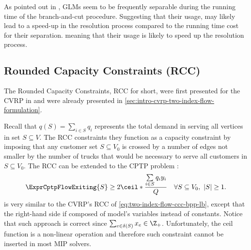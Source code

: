 As pointed out in \textcite{jepsen2014},
GLMs seem to be frequently separable during the running time of the branch-and-cut procedure.
Suggesting that their usage, may likely lead to a speed-up in the resolution process
compared to the running time cost for their separation.
meaning that their usage is likely to speed up the resolution process.

\subsection{Rounded Capacity Constraints (RCC)}
\label{sec:cptp-rcc}

The Rounded Capacity Constraints, RCC for short, were first presented
for the CVRP  in \textcite{laporte1983}
and were already presented in \cref{sec:intro-cvrp-two-index-flow-formulation}.

Recall that $q(S) = \sum_{i \in S} q_i$ represents
the total demand in serving all vertices in set $S \subseteq V$.
The RCC constraints they function as a capacity constraint
by imposing that any customer set $S \subseteq V_0$ is crossed by a number of edges
not smaller by the number of trucks that would be necessary to serve all customers in $S \subseteq V_0$.
The RCC can be extended to the CPTP problem \parencite{jepsen2014}:
\begin{equation}
	\label{eq:cptp-rcc-inequality-original}
	\ExprCptpFlowExiting{S} \ge 2 \ceil*{\frac{\sum\limits_{i \in S} q_i y_i}{Q}} \quad \forall S \subseteq V_0,\ |S| \ge 1.
\end{equation}
is very similar to the CVRP's RCC of \cref{eq:two-index-flow-ccc-bpp-lb},
except that the right-hand side if composed of model's variables instead of constants.
Notice that such approach is correct since $\sum_{e \in \delta(S)} x_e \in \Z_+$.
Unfortunately, the ceil function is a non-linear operation and therefore
such constraint cannot be inserted in most MIP solvers.

